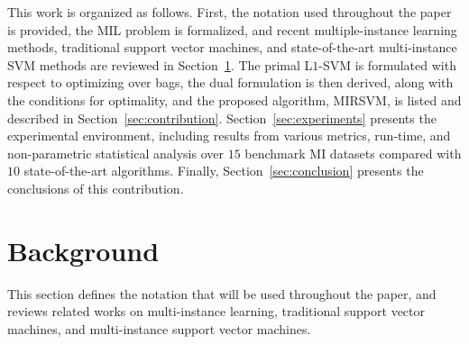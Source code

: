 This work is organized as follows. First, the notation used throughout the paper is provided, the MIL problem is formalized, and recent multiple-instance learning methods, traditional support vector machines, and state-of-the-art multi-instance SVM methods are reviewed in Section~\ref{sec:background}. The primal L$1$-SVM is formulated with respect to optimizing over bags, the dual formulation is then derived, along with the conditions for optimality, and the proposed algorithm, MIRSVM, is listed and described in Section~\ref{sec:contribution}. Section~\ref{sec:experiments} presents the experimental environment, including results from various metrics, run-time, and non-parametric statistical analysis over $15$ benchmark MI datasets compared with $10$ state-of-the-art algorithms. Finally, Section~\ref{sec:conclusion} presents the conclusions of this contribution.

\section{Background}\label{sec:background}
This section defines the notation that will be used throughout the paper, and reviews related works on multi-instance learning, traditional support vector machines, and multi-instance support vector machines.

